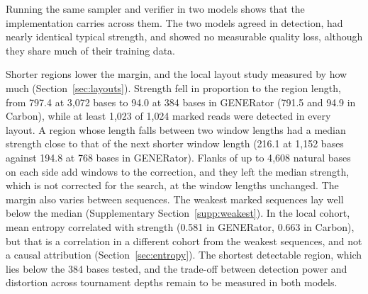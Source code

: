 \documentclass[10pt,twocolumn]{article}
\begin{document}
Running the same sampler and verifier in two models shows that the implementation carries across
them. The two models agreed in detection, had nearly identical typical strength, and showed no
measurable quality loss, although they share much of their training data.

Shorter regions lower the margin, and the local layout study measured by how much
(Section~\ref{sec:layouts}). Strength fell in proportion to the region length, from 797.4 at 3{,}072
bases to 94.0 at 384 bases in GENERator (791.5 and 94.9 in Carbon), while at least 1{,}023 of 1{,}024
marked reads were detected in every layout. A region whose length falls between two window lengths had a median strength close to that of
the next shorter window length
(216.1 at 1{,}152 bases against 194.8 at 768 bases in GENERator). Flanks of up to 4{,}608 natural
bases on each side add windows to the correction, and they left the median strength, which is not corrected for the search, at the window lengths
unchanged. The margin also varies between sequences. The weakest marked sequences lay well
below the median (Supplementary Section~\ref{supp:weakest}). In the local cohort, mean entropy
correlated with strength (0.581 in GENERator, 0.663 in Carbon), but that is a correlation in a
different cohort from the weakest sequences, and not a causal attribution
(Section~\ref{sec:entropy}). The shortest detectable region, which lies below the 384 bases tested,
and the trade-off between detection power and distortion across tournament depths remain to be
measured in both models.
\end{document}

